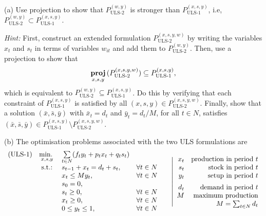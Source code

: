 \vspace{5pt}

(a) Use projection to show that $P_{\text{ULS-2}}^{(w,y)}$ is stronger than $P_{\text{ULS-1}}^{(x,s,y)}$, i.e, $P_{\text{ULS-2}}^{(w,y)} \subset P_{\text{ULS-1}}^{(x,s,y)}$.

\emph{Hint:} 
First, construct an extended formulation $P_{\text{ULS-2}}^{(x,s,y,w)}$ by writing the variables $x_t$ and $s_t$ in terms of variables $w_{it}$ and add them to $P_{\text{ULS-2}}^{(w,y)}$. Then, use a projection to show that 
\begin{equation*}
\mathop{\bf proj}_{x,s,y}\,(P_{\text{ULS-2}}^{(x,s,y,w)}) \subseteq P_{\text{ULS-1}}^{(x,s,y)},
\end{equation*} 
which is equivalent to $P_{\text{ULS-2}}^{(w,y)} \subseteq P_{\text{ULS-1}}^{(x,s,y)}$. Do this by verifying that each constraint of $P_{\text{ULS-1}}^{(x,s,y)}$ is satisfied by all $(x,s,y)\in P_{\text{ULS-2}}^{(x,s,y,w)}$. Finally, show that a solution $(\bar{x},\bar{s},\bar{y})$ with $\bar{x}_t = d_t$ and \lb $\bar{y}_t = d_t/M$, for all $t \in N$, satisfies $(\bar{x},\bar{s},\bar{y}) \in P_{\text{ULS-1}}^{(x,s,y)} \setminus P_{\text{ULS-2}}^{(x,s,y,w)}$.

\vspace{5pt}

(b) The optimisation problems associated with the two ULS formulations are
\begin{align*}
	\begin{array}{lrlr}
		\text{(ULS-1)} & \mathop{\text{min.~}}\limits_{x,s,y} & \sum\limits_{t\in N} (f_ty_t + p_tx_t + q_ts_t)\\
		         & \mathop{\text{s.t.:~}}  & s_{t-1} + x_t = d_t + s_t, & \forall t\in N\\
		    	 &      & x_t  \leq M y_t, 		  & \forall t\in N\\
		    	 &      & s_0 = 0, 			      & 			  \\
		    	 &      & s_t \geq 0, 			  & \forall t\in N\\
		    	 &      & x_t \geq 0, 			  & \forall t\in N\\
		    	 &      & 0 \leq y_{t} \leq 1, 	  & \forall t\in N
	 \end{array}
	 \quad~\left|
	 \begin{array}{rr}
	  	x_t  & \text{production in period } t\\
	    s_t  & \text{stock in period }      t\\
	    y_t  & \text{setup in period }      t\\[5pt]
	    d_t  & \text{demand in period }     t\\
	    M    & \text{maximum production}\\
	         & M = \sum_{t\in N}d_t
	 \end{array}\right.
\end{align*}\\[-30pt]

